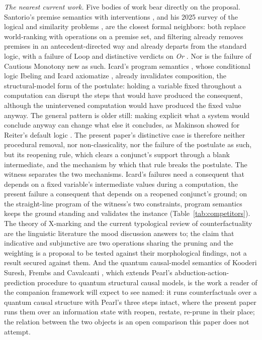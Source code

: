 \textit{The nearest current work.} Five bodies of work bear directly on the proposal. Santorio's premise semantics with interventions \parencite*{santorio2019interventions}, and his 2025 survey of the logical and similarity problems \parencite{santorio2025handbook}, are the closest formal neighbors: both replace world-ranking with operations on a premise set, and filtering already removes premises in an antecedent-directed way and already departs from the standard logic, with a failure of Loop and distinctive verdicts on \emph{Or} \parencite{santorio2019interventions}. Nor is the failure of Cautious Monotony new as such. Icard's program semantics \parencite*{icard2017programs}, whose conditional logic Ibeling and Icard axiomatize \parencite*{ibeling2018conditional}, already invalidates composition, the structural-model form of the postulate: holding a variable fixed throughout a computation can disrupt the steps that would have produced the consequent, although the unintervened computation would have produced the fixed value anyway. The general pattern is older still: making explicit what a system would conclude anyway can change what else it concludes, as Makinson showed for Reiter's default logic \parencite*{makinson1989general}. The present paper's distinctive case is therefore neither procedural removal, nor non-classicality, nor the failure of the postulate as such, but its reopening rule, which clears a conjunct's support through a blank intermediate, and the mechanism by which that rule breaks the postulate. The witness separates the two mechanisms. Icard's failures need a consequent that depends on a fixed variable's intermediate values during a computation, the present failure a consequent that depends on a reopened conjunct's ground; on the straight-line program of the witness's two constraints, program semantics keeps the ground standing and validates the instance (Table~\ref{tab:competitors}). The theory of X-marking \parencite{vonfintel2023xmarking} and the current typological review of counterfactuality \parencite{vonprince2025counterfactuality} are the linguistic literature the mood discussion answers to; the claim that indicative and subjunctive are two operations sharing the pruning and the weighting is a proposal to be tested against their morphological findings, not a result secured against them. And the quantum causal-model semantics of Kooderi Suresh, Frembs and Cavalcanti \parencite*{suresh2026counterfactuals}, which extends Pearl's abduction-action-prediction procedure to quantum structural causal models, is the work a reader of the companion framework will expect to see named: it runs counterfactuals over a quantum causal structure with Pearl's three steps intact, where the present paper runs them over an information state with reopen, restate, re-prune in their place; the relation between the two objects is an open comparison this paper does not attempt.

